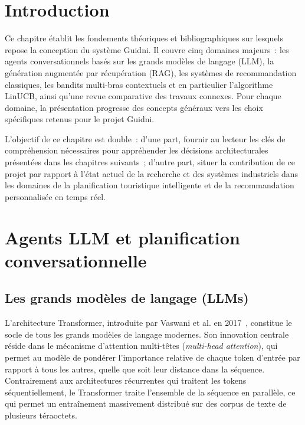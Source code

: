 
\section{Introduction}

Ce chapitre établit les fondements théoriques et bibliographiques sur lesquels repose la
conception du système Guidni. Il couvre cinq domaines majeurs~: les agents conversationnels
basés sur les grands modèles de langage (LLM), la génération augmentée par récupération (RAG),
les systèmes de recommandation classiques, les bandits multi-bras contextuels et en particulier
l'algorithme LinUCB, ainsi qu'une revue comparative des travaux connexes. Pour chaque domaine,
la présentation progresse des concepts généraux vers les choix spécifiques retenus pour le
projet Guidni.

L'objectif de ce chapitre est double~: d'une part, fournir au lecteur les clés de compréhension
nécessaires pour appréhender les décisions architecturales présentées dans les chapitres suivants~;
d'autre part, situer la contribution de ce projet par rapport à l'état actuel de la recherche et
des systèmes industriels dans les domaines de la planification touristique intelligente et de la
recommandation personnalisée en temps réel.


\section{Agents LLM et planification conversationnelle}

\subsection{Les grands modèles de langage (LLMs)}

L'architecture Transformer, introduite par Vaswani et al. en 2017~\cite{vaswani2017attention},
constitue le socle de tous les grands modèles de langage modernes. Son innovation centrale réside
dans le mécanisme d'attention multi-têtes (\textit{multi-head attention}), qui permet au modèle
de pondérer l'importance relative de chaque token d'entrée par rapport à tous les autres, quelle
que soit leur distance dans la séquence. Contrairement aux architectures récurrentes qui traitent
les tokens séquentiellement, le Transformer traite l'ensemble de la séquence en parallèle, ce qui
permet un entraînement massivement distribué sur des corpus de texte de plusieurs téraoctets.

